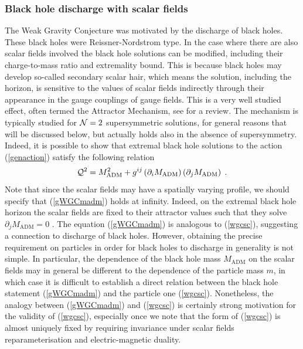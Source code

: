 \documentclass[11pt,a4paper]{article}
\numberwithin{equation}{section}
\numberwithin{table}{section}\setlength{\multlinegap}{25pt}
\newcommand{\be}{\begin{equation}}
\newcommand{\ee}{\end{equation}}
\begin{document}
\subsubsection*{Black hole discharge with scalar fields}

The Weak Gravity Conjecture was motivated by the discharge of black holes. These black holes were Reissner-Nordstrom type. In the case where there are also scalar fields involved the black hole solutions can be modified, including their charge-to-mass ratio and extremality bound. This is because black holes may develop so-called secondary scalar hair, which means the solution, including the horizon, is sensitive to the values of scalar fields indirectly through their appearance in the gauge couplings of gauge fields. This is a very well studied effect, often termed the Attractor Mechanism, see \cite{DallAgata:2011zkh} for a review. The mechanism is typically studied for ${\cal N}=2$ supersymmetric solutions, for general reasons that will be discussed below, but actually holds also in the absence of supersymmetry. Indeed, it is possible to show that extremal black hole solutions to the action (\ref{genaction}) satisfy the following relation \cite{Ceresole:2007wx,DallAgata:2011zkh}
\be
{\cal Q}^2 = M_{\mathrm{ADM}}^2 + g^{ij} \left(\partial_i M_{\mathrm{ADM}}\right) \left(\partial_j M_{\mathrm{ADM}}\right) \;. \label{gWGCmadm}
\ee
Note that since the scalar fields may have a spatially varying profile, we should specify that (\ref{gWGCmadm}) holds at infinity. Indeed, on the extremal black hole horizon the scalar fields are fixed to their attractor values such that they solve $\partial_j M_{\mathrm{ADM}}=0$ \cite{Ceresole:2007wx}.
The equation (\ref{gWGCmadm}) is analogous to (\ref{wgcsc}), suggesting a connection to discharge of black holes. However, obtaining the precise requirement on particles in order for black holes to discharge in generality is not simple. In particular, the dependence of the black hole mass $M_{\mathrm{ADM}}$ on the scalar fields may in general be different to the dependence of the particle mass $m$, in which case it is difficult to establish a direct relation between the black hole statement (\ref{gWGCmadm}) and the particle one (\ref{wgcsc}). Nonetheless, the analogy between (\ref{gWGCmadm}) and (\ref{wgcsc}) is certainly strong motivation for the validity of (\ref{wgcsc}), especially once we note that the form of (\ref{wgcsc}) is almost uniquely fixed by requiring invariance under scalar fields reparameterisation and electric-magnetic duality.
\end{document}
